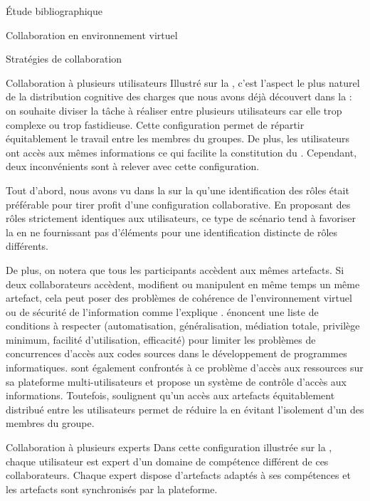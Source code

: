 \documentclass[myfrancais,ngerman,english,french]{mythesis}
\begin{document}
\begin{mychapter}{Étude bibliographique}
\begin{mysection}{Collaboration en environnement virtuel}
\begin{mysubsection}{Stratégies de collaboration}
\begin{mysubsubsection}{Collaboration à plusieurs utilisateurs}
					Illustré sur la , c'est l'aspect le plus naturel de la distribution cognitive des charges que nous avons déjà découvert dans la  : on souhaite diviser la tâche à réaliser entre plusieurs utilisateurs car elle trop complexe ou trop fastidieuse.
					Cette configuration permet de répartir équitablement le travail entre les membres du groupes.
					De plus, les utilisateurs ont accès aux mêmes informations ce qui facilite la constitution du \mygrounding.
					Cependant, deux inconvénients sont à relever avec cette configuration.

					Tout d'abord, nous avons vu dans la  sur la  qu'une identification des rôles était préférable pour tirer profit d'une configuration collaborative.
					En proposant des rôles strictement identiques aux utilisateurs, ce type de scénario tend à favoriser la  en ne fournissant pas d'éléments pour une identification distincte de rôles différents.

					De plus, on notera que tous les participants accèdent aux mêmes artefacts.
					Si deux collaborateurs accèdent, modifient ou manipulent en même temps un même artefact, cela peut poser des problèmes de cohérence de l'environnement virtuel ou de sécurité de l'information comme l'explique .
					 énoncent une liste de conditions à respecter (automatisation, généralisation, médiation totale, privilège minimum, facilité d'utilisation, efficacité) pour limiter les problèmes de concurrences d'accès aux codes sources dans le développement de programmes informatiques.
					 sont également confrontés à ce problème d'accès aux ressources sur sa plateforme multi-utilisateurs \myMARE et propose un système de contrôle d'accès aux informations.
					Toutefois,  soulignent qu'un accès aux artefacts équitablement distribué entre les utilisateurs permet de réduire la  en évitant l'isolement d'un des membres du groupe.
				\end{mysubsubsection}
				\begin{mysubsubsection}{Collaboration à plusieurs experts}
					Dans cette configuration illustrée sur la , chaque utilisateur est expert d'un domaine de compétence différent de ces collaborateurs.
					Chaque expert dispose d'artefacts adaptés à ses compétences et les artefacts sont synchronisés par la plateforme.


\end{mysubsubsection}
\end{mysubsection}
\end{mysection}
\end{mychapter}
\end{document}
